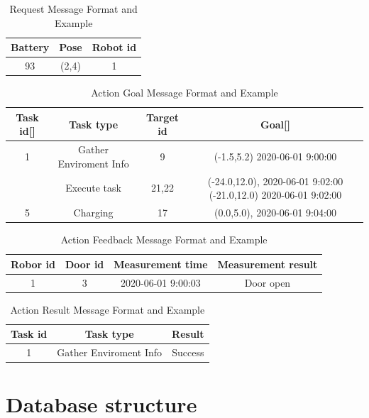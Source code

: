 \begin{table}[htb]
\centering
\begin{tabular}{|c|c|c|} 
\hline
Battery & Pose & Robot id\\
\hline\hline
93	&(2,4)	&1 \\ [1ex] 
\hline
\end{tabular}
\caption{Request Message Format and Example}
\label{tab:request_message}
\end{table}

\begin{table}[htb]
\centering
\begin{tabular}{|c|c|c|c|} 
\hline
Task id[] &Task type & Target id & Goal[] \\
\hline\hline
1& Gather Enviroment Info & 9	& (-1.5,5.2) 2020-06-01 9:00:00 \\
\hline
[3,4]	& Execute task & 21,22	& (-24.0,12.0), 2020-06-01 9:02:00 (-21.0,12.0) 2020-06-01 9:02:00 \\
\hline
5	& Charging	& 17	&(0.0,5.0), 2020-06-01 9:04:00 \\ [1ex] 
\hline
\end{tabular}
\caption{Action Goal Message Format and Example}
\label{tab:goal_message}
\end{table}

\begin{table}[htb]
\centering
\begin{tabular}{|c|c|c|c|} 
\hline
Robor id & Door id & Measurement time & Measurement result \\
\hline\hline
1	& 3	& 2020-06-01 9:00:03 & Door open \\ [1ex] 
\hline
\end{tabular}
\caption{Action Feedback Message Format and Example}
\label{tab:feedback_message}
\end{table}

\begin{table}[htb]
\centering
\begin{tabular}{|c|c|c|} 
\hline
Task id	& Task type	& Result\\
\hline\hline
1 & Gather Enviroment Info & Success \\ [1ex] 
\hline
\end{tabular}
\caption{Action Result Message Format and Example}
\label{tab:result_message}
\end{table}







\section{Database structure}

